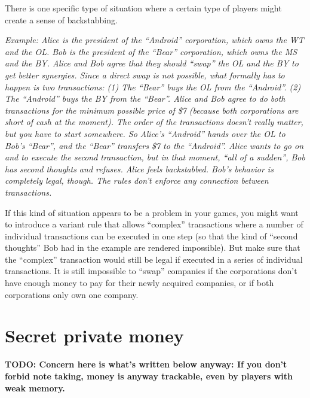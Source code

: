 \documentclass[10pt,final]{report}
\begin{document}
\begin{multicols}{2}
There is one specific type of situation where a certain type of
players might create a sense of backstabbing.

\emph{Example: Alice is the president of the ``Android'' corporation,
  which owns the WT and the OL. Bob is the president of the ``Bear''
  corporation, which owns the MS and the BY. Alice and Bob agree that
  they should ``swap'' the OL and the BY to get better
  synergies. Since a direct swap is not possible, what formally has to
  happen is two transactions: (1) The ``Bear'' buys the OL from the
  ``Android''. (2) The ``Android'' buys the BY from the
  ``Bear''. Alice and Bob agree to do both transactions for the
  minimum possible price of \$7 (because both corporations are short
  of cash at the moment). The order of the transactions doesn't really
  matter, but you have to start somewhere. So Alice's ``Android''
  hands over the OL to Bob's ``Bear'', and the ``Bear'' transfers \$7
  to the ``Android''. Alice wants to go on and to execute the second
  transaction, but in that moment, ``all of a sudden'', Bob has second
  thoughts and refuses. Alice feels backstabbed. Bob's behavior is
  completely legal, though. The rules don't enforce any connection
  between transactions.}

If this kind of situation appears to be a problem in your games, you
might want to introduce a variant rule that allows ``complex''
transactions where a number of individual transactions can be executed in
one step (so that the kind of ``second thoughts'' Bob had in the
example are rendered impossible). But make sure that the ``complex''
transaction would still be legal if executed in a series of individual
transactions. It is still impossible to ``swap'' companies if the
corporations don't have enough money to pay for their newly acquired
companies, or if both corporations only own one company.

\section{Secret private money}

\textbf{TODO: Concern here is what's written below anyway: If you
  don't forbid note taking, money is anyway trackable, even by players
  with weak memory.}


\end{multicols}
\end{document}
